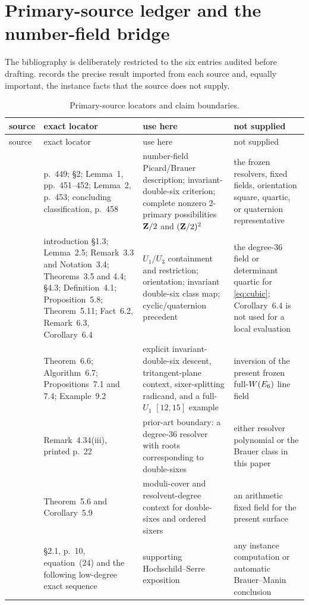 \section{Primary-source ledger and the number-field bridge}
\label{app:sources}

The bibliography is deliberately restricted to the six entries audited
before drafting.   records the precise result imported
from each source and, equally important, the instance facts that the source
does not supply.

\begin{longtable}{@{}>{\raggedright\arraybackslash}p{}
 >{\raggedright\arraybackslash}p{}
 >{\raggedright\arraybackslash}p{}
 >{\raggedright\arraybackslash}p{}@{}}
\caption{Primary-source locators and claim boundaries.}
\label{tab:source-ledger}\\
\toprule
source & exact locator & use here & not supplied\\
\midrule
\endfirsthead
\toprule
source & exact locator & use here & not supplied\\
\midrule
\endhead
\cite{SwinnertonDyer1993}
& p.~449; \S2; Lemma~1, pp.~451--452; Lemma~2, p.~453; concluding
classification, p.~458
& number-field Picard/Brauer description; invariant-double-six criterion;
complete nonzero 2-primary possibilities \(\mathbf Z/2\) and \((\mathbf Z/2)^2\)
& the frozen resolvers, fixed fields, orientation square, quartic, or
quaternion representative\\
\addlinespace
\cite{ElsenhansJahnel2010Brauer}
& introduction \S1.3; Lemma~2.5; Remark~3.3 and Notation~3.4;
Theorems~3.5 and 4.4; \S4.3; Definition~4.1; Proposition~5.8;
Theorem~5.11; Fact~6.2, Remark~6.3, Corollary~6.4
& \(U_1/U_3\) containment and restriction; orientation; invariant
double-six class map; cyclic/quaternion precedent
& the degree-\(36\) field or determinant quartic for \cref{eq:cubic};
Corollary~6.4 is not used for a local evaluation\\
\addlinespace
\cite{ElsenhansJahnel2010DoubleSix}
& Theorem~6.6; Algorithm~6.7; Propositions~7.1 and 7.4; Example~9.2
& explicit invariant-double-six descent, tritangent-plane context,
sixer-splitting radicand, and a full-\(U_1\) \([12,15]\) example
& inversion of the present frozen full-\(W(E_6)\) line field\\
\addlinespace
\cite{ElsenhansJahnel2012OrderThree}
& Remark~4.34(iii), printed p.~22
& prior-art boundary: a degree-\(36\) resolver with roots corresponding to
double-sixes
& either resolver polynomial or the Brauer class in this paper\\
\addlinespace
\cite{FarbWolfson2019}
& Theorem~5.6 and Corollary~5.9
& moduli-cover and resolvent-degree context for double-sixes and ordered
sixers
& an arithmetic fixed field for the present surface\\
\addlinespace
\cite{Viray2023}
& \S2.1, p.~10, equation~(24) and the following low-degree exact sequence
& supporting Hochschild--Serre exposition
& any instance computation or automatic Brauer--Manin conclusion\\
\bottomrule
\end{longtable}

